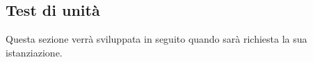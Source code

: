 \subsection{Test di unità}
Questa sezione verrà sviluppata in seguito quando sarà richiesta la sua istanziazione.